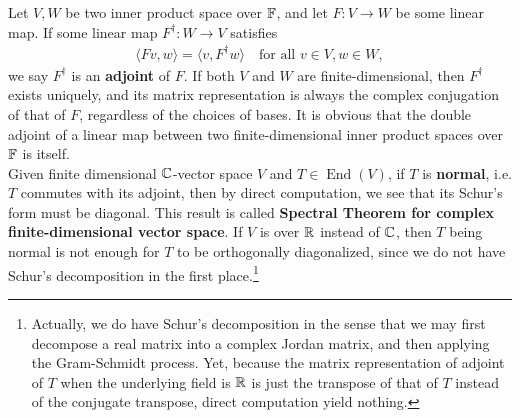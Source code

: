 \documentclass{report}
\begin{document}
Let $V,W$ be two inner product space over  $\mathbb{F}$, and let  $F:V\rightarrow W$ be some linear map. If some linear map $F^\dagger:W\rightarrow V$ satisfies 
\begin{align*}
\langle Fv,w\rangle = \langle v,F^\dagger w\rangle \quad\text{for all }v\in V,w\in W, 
\end{align*}
we say $F^\dagger $ is an  \textbf{adjoint} of $F$. If both $V$ and $W$ are finite-dimensional, then $F^\dagger $ exists uniquely, and its matrix representation is always the complex conjugation of that of $F$, regardless of the choices of bases. It is obvious that the double adjoint of a linear map between two finite-dimensional inner product spaces over $\mathbb{F}$ is itself. \\

Given finite dimensional $\mathbb{C}$-vector space  $V$ and  $T \in \operatorname{End}(V)$, if $T$ is \textbf{normal}, i.e. $T$ commutes with its adjoint, then by direct computation, we see that its Schur's form must be diagonal. This result is called \textbf{Spectral Theorem for complex finite-dimensional vector space}. If $V$ is over $\mathbb{R}$ instead of  $\mathbb{C}$, then $T$ being normal is not enough for $T$ to be orthogonally diagonalized, since we do not have Schur's decomposition in the first place.\footnote{Actually, we do have Schur's decomposition in the sense that we may first decompose a real matrix into a complex Jordan matrix, and then applying the Gram-Schmidt process. Yet, because the matrix representation of adjoint of $T$ when the underlying field is  $\mathbb{R}$ is just the transpose of that of $T$ instead of  the conjugate transpose, direct computation yield nothing.} 
\end{document}
